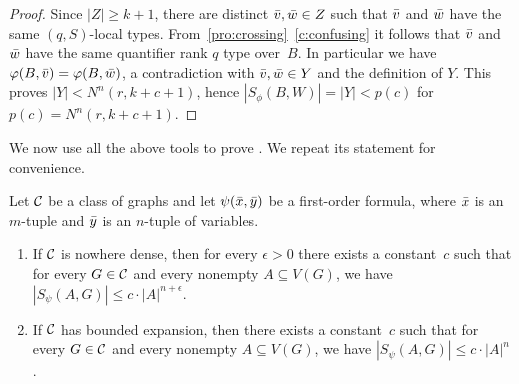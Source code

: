 \begin{proof}
Since $|Z|\geq k+1$, there are  distinct $\bar{v},\bar{w}\in Z$ such that 
$\bar{v}$ and $\bar{w}$ have the same $(q,S)$-local types.
From~\cref{pro:crossing}~\cref{c:confusing} it follows that $\bar{v}$ and $\bar{w}$
have the same quantifier rank $q$ type over~$B$.
In particular we have $\varphi(B,\bar{v})=\varphi(B,\bar{w})$, a contradiction with $\bar{v},\bar{w}\in Y$ and the definition of $Y$. 
This proves $|Y|<N^n(r,k+c+1)$, hence $|S_\phi(B,W)|=|Y|<p(c)$ for $p(c)= N^n(r,k+c+1)$.
\end{proof}

We now use all the above tools to prove . We repeat its statement for convenience.

\setcounter{theorem}{2}
\begin{theorem}
Let $\mathcal{C}$ be a class of graphs and let $\psi(\bar{x},\bar{y})$ be a first-order formula, where 
$\bar{x}$ is an $m$-tuple and $\bar{y}$ is an $n$-tuple of variables. 
\begin{enumerate}[(1)]
\item If $\mathcal{C}$ is nowhere dense, then for every $\epsilon>0$ 
there exists a constant~$c$ such that for every $G\in \mathcal{C}$ and every nonempty
$A\subseteq V(G)$, we have $|S_\psi(A,G)|\leq c\cdot |A|^{n+\epsilon}.$

\item If $\mathcal{C}$ has bounded expansion, then there exists a constant~$c$ such that for every $G\in \mathcal{C}$ and every nonempty $A\subseteq V(G)$, we have $|S_\psi(A,G)|\leq c\cdot |A|^n$.
\end{enumerate}
\end{theorem}

